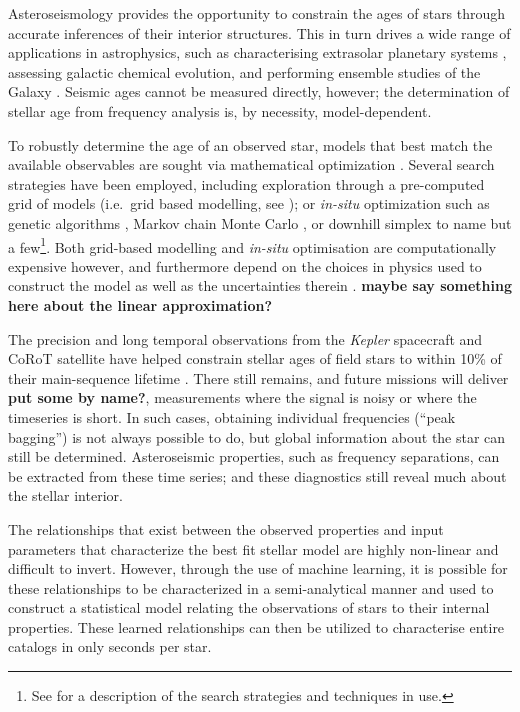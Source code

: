 \documentclass[manuscript]{aastex}
\begin{document}
Asteroseismology provides the opportunity to constrain the ages of stars through accurate inferences of their interior structures.  This in turn drives a wide range of applications in astrophysics, such as characterising extrasolar planetary systems \citep{2015ApJ...799..170C,2015MNRAS.452.2127S}, assessing galactic chemical evolution, and performing ensemble studies of the Galaxy \citep{2011Sci...332..213C, 2013MNRAS.429..423M, 2014ApJS..210....1C}. Seismic ages cannot be measured directly, however; the determination of stellar age from frequency analysis is, by necessity, model-dependent.


To robustly determine the age of an observed star, models that best match the available observables are sought via mathematical optimization \citep{1994ApJ...427.1013B}. Several search strategies have been employed, including exploration through a pre-computed grid of models (i.e.~grid based modelling, see \citealt{2011ApJ...730...63G, 2014ApJS..210....1C}); or \emph{in-situ} optimization such as genetic algorithms \citep{2014ApJS..214...27M}, Markov chain Monte Carlo \citep{2012MNRAS.427.1847B}, or downhill simplex \citep{2013ApJS..208....4P} to name but a few\footnote{See \citet{2015MNRAS.452.2127S} for a description of the search strategies and techniques in use.}. Both grid-based modelling and \emph{in-situ} optimisation are computationally expensive however, and furthermore depend on the choices in physics used to construct the model as well as the uncertainties therein \citep{2014A&A...569A..21L}. \textbf{maybe say something here about the linear approximation?}

The precision and long temporal observations from the \emph{Kepler} spacecraft and CoRoT satellite have helped constrain stellar ages of field stars to within 10\% of their main-sequence lifetime \citep{2015MNRAS.452.2127S}. There still remains, and future missions will deliver \textbf{put some by name?}, measurements where the signal is noisy or where the timeseries is short. In such cases, obtaining individual frequencies (``peak bagging'') is not always possible to do, but global information about the star can still be determined. Asteroseismic properties, such as frequency separations, can be extracted from these time series; and these diagnostics still reveal much about the stellar interior. 

The relationships that exist between the observed properties and input parameters that characterize the best fit stellar model are highly non-linear and difficult to invert. However, through the use of machine learning, it is possible for these relationships to be characterized in a semi-analytical manner and used to construct a statistical model relating the observations of stars to their internal properties. These learned relationships can then be utilized to characterise entire catalogs in only seconds per star. 
\end{document}
